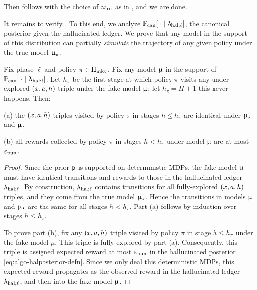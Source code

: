 Then  follows with the choice of $n_{\mathrm{lrn}}$ as in , and we are done.

It remains to verify . To this end, we analyze
    $\operatorname{\mathbb{P}}_{\mathrm{can}}[\;\cdot \mid \uplambda_{\mathrm{hal};\ell}]$,
the canonical posterior given the hallucinated ledger. We prove that any model in the support of this distribution can partially \emph{simulate} the trajectory of any given policy under the true model $\upmu_{\star}$.

\begin{lemma}\label{lem:modclass_not}
Fix phase $\ell$ and policy $\pi \in \Pi_{\mathrm{mkv}}$. Fix any model $\upmu$ in the support of
    $\operatorname{\mathbb{P}}_{\mathrm{can}}[\;\cdot \mid \uplambda_{\mathrm{hal};\ell}]$.
Let $h_\pi$ be the first stage at which policy $\pi$ visits any under-explored $(x,a,h)$ triple under the fake model $\upmu$; let $h_\pi=H+1$ this never happens. Then:
\begin{OneLiners}
\item[(a)]
the $(x,a,h)$ triples visited by policy $\pi$ in stages $h\leq h_\pi$ are identical under $\upmu_{\star}$ and $\upmu$.
\item[(b)]
all rewards collected by policy $\pi$ in stages $h<h_\pi$ under model $\upmu$ are at most $\varepsilon_{\mathrm{pun}}$.
\end{OneLiners}
\end{lemma}

\begin{proof}
Since the prior ${\normalfont \texttt{\textbf{p}}}$ is supported on deterministic MDPs, the fake model $\upmu$ must have identical transitions and rewards to those in the hallucinated ledger $\uplambda_{\mathrm{hal};\ell}$. By construction, $\uplambda_{\mathrm{hal};\ell}$ contains transitions for all fully-explored $(x,a,h)$ triples, and they come from the true model $\upmu_{\star}$. Hence the transitions in models $\upmu$ and $\upmu_{\star}$ are the same for all stages $h < h_\pi$. Part (a) follows by induction over stages $h \le h_\pi$.

To prove part (b), fix any $(x,a,h)$ triple visited by policy $\pi$ in stage $h\leq h_\pi$ under the fake model $\mu$. This triple is fully-explored by part (a). Consequently, this triple is assigned expected reward at most $\varepsilon_{\mathrm{pun}}$ in the hallucinated posterior \eqref{eq:algo-halposterior-defn}. Since we only deal this deterministic MDPs, this expected reward propagates as the observed reward in the hallucinated ledger $\uplambda_{\mathrm{hal};\ell}$, and then into the fake model $\upmu$.
\end{proof}

